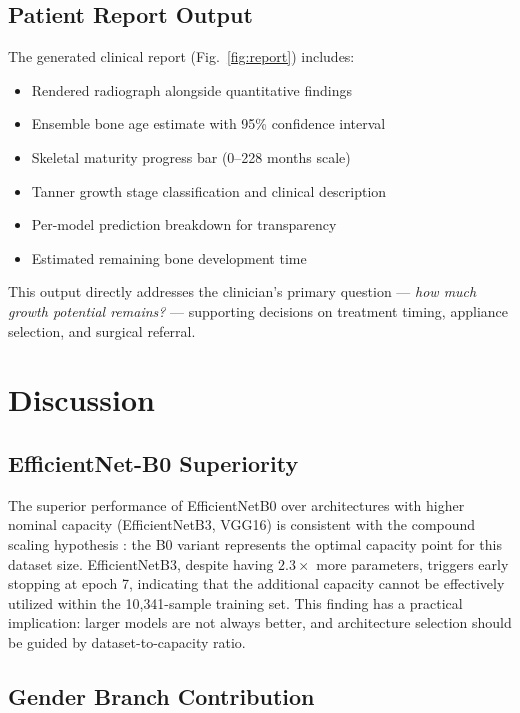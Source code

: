\documentclass[conference]{IEEEtran}
\begin{document}
\subsection{Patient Report Output}

The generated clinical report (Fig.~\ref{fig:report}) includes:
\begin{itemize}
  \item Rendered radiograph alongside quantitative findings
  \item Ensemble bone age estimate with 95\% confidence interval
  \item Skeletal maturity progress bar (0--228 months scale)
  \item Tanner growth stage classification and clinical description
  \item Per-model prediction breakdown for transparency
  \item Estimated remaining bone development time
\end{itemize}

This output directly addresses the clinician's primary question —
\textit{how much growth potential remains?} — supporting decisions
on treatment timing, appliance selection, and surgical referral.

\section{Discussion}

\subsection{EfficientNet-B0 Superiority}

The superior performance of EfficientNetB0 over architectures with
higher nominal capacity (EfficientNetB3, VGG16) is consistent with
the compound scaling hypothesis \cite{tan2019efficientnet}: the B0
variant represents the optimal capacity point for this dataset size.
EfficientNetB3, despite having $2.3\times$ more parameters, triggers
early stopping at epoch 7, indicating that the additional capacity
cannot be effectively utilized within the 10{,}341-sample training
set. This finding has a practical implication: larger models are not
always better, and architecture selection should be guided by
dataset-to-capacity ratio.

\subsection{Gender Branch Contribution}
\end{document}
